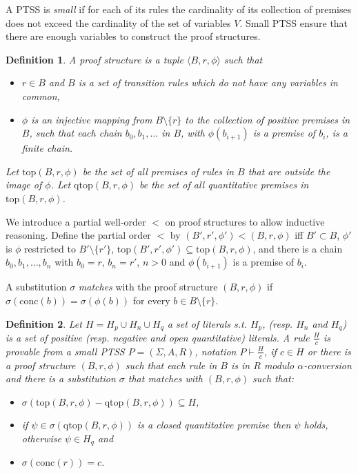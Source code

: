 \documentclass[submission,copyright,creativecommons]{eptcs}
\newtheorem{definition}{Definition}
\newcommand{\dedrule}[2]{\frac{#1}{#2}}
\newcommand{\tuple}[1]{\langle{#1}\rangle}
\newcommand{\conc}[1]{\textrm{conc}(#1)}
\newcommand{\proves}{\vdash}
\newcommand{\rtop}{\text{top}}
\newcommand{\qtop}{\text{qtop}}
\begin{document}
 A PTSS is \emph{small} if for each of its rules the cardinality of its collection of premises does not exceed the cardinality of the set of variables $V$. Small PTSS ensure that there are enough variables to construct the proof structures.

\begin{definition}
 \label{def:proofStructure}
 A \emph{proof structure} is a tuple $\tuple{B, r, \phi}$ such that 
\begin{itemize}
 \item $r \in B$ and $B$ is a set of transition rules which do not have any variables in common,
 \item $\phi$ is an injective mapping from $B\setminus\{r\}$ to the collection of positive premises in $B$, 
          such that each chain $b_0, b_1, \ldots$ in $B$, with $\phi(b_{i+1})$ is a premise of $b_i$,
          is a finite chain. 
\end{itemize}
Let $\rtop(B,r,\phi)$ be the set of all premises of rules in $B$ that are outside the image of $\phi$. Let  $\qtop(B,r,\phi)$ be the set of all quantitative premises in  $\rtop(B,r,\phi)$.
\end{definition}

We introduce a partial well-order $<$ on proof structures to allow inductive reasoning. Define the partial order $<$ by
$(B', r', \phi') < (B,r,\phi)$ iff 
  $B' \subset B$, 
  $\phi'$ is $\phi$ restricted to $B' \setminus \{r'\}$,
  $\rtop(B', r', \phi') \subseteq \rtop(B,r,\phi)$,
and there is a chain $b_0, b_1, \ldots, b_n$ with 
  $b_0=r$, $b_n=r'$, $n>0$ and $\phi(b_{i+1})$ is a premise of $b_i$.

A substitution $\sigma$ \emph{matches} with the proof structure $(B,r,\phi)$ if $\sigma(\conc{b}) = \sigma(\phi(b))$ for every $b \in B\setminus\{r\}$.

\begin{definition}\label{def:provable}
 Let $H = H_p \cup H_n \cup H_q$ a set of literals s.t. $H_p$, (resp. $H_n$ and $H_q$) is a set of positive (resp. negative and open quantitative) literals.
A rule $\textstyle{\dedrule{H}{c}}$ is provable from a small PTSS $P = (\Sigma, A, R)$, 
 notation $P \proves \dedrule{H}{c} $, if $c \in H$ or there is a proof structure $(B,r,\phi)$ such that
 each rule in $B$ is in $R$ modulo $\alpha$-conversion and there is a substitution $\sigma$ that matches
 with $(B,r,\phi)$  such that:
\begin{itemize}
 \item $\sigma(\rtop(B, r, \phi) - \qtop(B, r, \phi)) \subseteq H$, 
 \item if $\psi \in \sigma(\qtop(B, r, \phi))$ is a closed quantitative premise then $\psi$ holds,
          otherwise $\psi \in H_q$ and 
 \item $\sigma(\conc{r})=c$.          
\end{itemize}
\end{definition}
\end{document}
